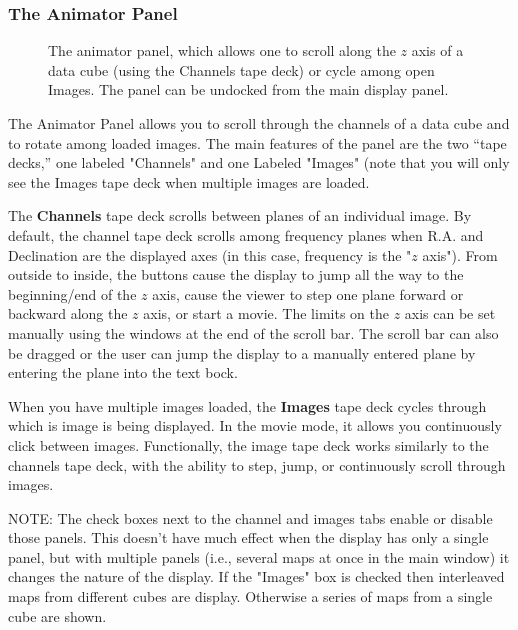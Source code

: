 \subsubsection{The Animator Panel}

\begin{figure}[h!]
\begin{center}
\caption{\label{fig:viewer_animator} The animator panel, which allows one to scroll along the $z$ axis of a data cube (using the Channels tape deck) 
or cycle among open Images. The panel can be undocked from the main display panel.}
\hrulefill
\end{center}
\end{figure}

The Animator Panel allows you to scroll through the channels of a data
cube and to rotate among loaded images. The main features of the
panel are the two ``tape decks,'' one labeled "Channels" and one Labeled "Images"
(note that you will only see the Images tape deck when multiple images are loaded.  

The {\bf Channels} tape deck scrolls between planes of an individual image. By default, the
channel tape deck scrolls among frequency planes when R.A. and
Declination are the displayed axes (in this case, frequency is the "$z$ axis"). From 
outside to inside, the buttons cause the display to jump all the way to the beginning/end of the $z$ axis,
cause the viewer to step one plane forward or backward along the $z$ axis,
or start a movie. The limits on the $z$ axis can be set manually using the windows at the end
of the scroll bar. The scroll bar can also be dragged or the user can jump the display to a manually
entered plane by entering the plane into the text bock.

When you have multiple images loaded, the {\bf Images} tape deck cycles through 
which is image is being displayed. In the movie mode, it allows you continuously click
between images. Functionally, the image tape deck works similarly to the channels tape deck,
with the ability to step, jump, or continuously scroll through images.

NOTE: The check boxes next to the channel and images tabs enable or disable those panels. This doesn't
have much effect when the display has only a single panel, but with multiple panels (i.e., several 
maps at once in the main window) it changes the nature of the display. If the "Images" box is  
checked then interleaved maps from different cubes are display. Otherwise a series of maps from a 
single cube are shown.

